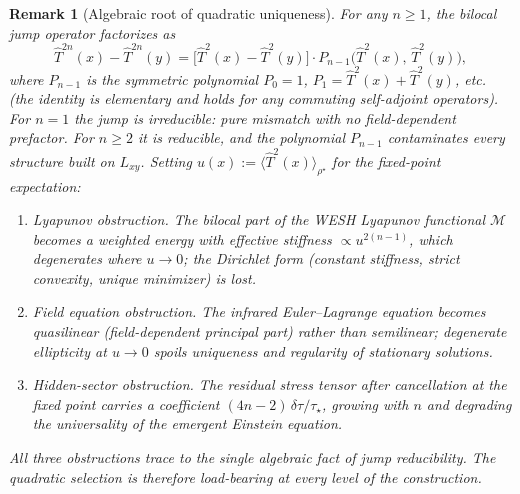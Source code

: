 \documentclass[12pt,a4paper]{article}
\newtheorem{remark}{Remark}[section]
\numberwithin{equation}{section}
\begin{document}
\begin{remark}[Algebraic root of quadratic uniqueness]
\label{rem:algebraic-T2}
For any $n \ge 1$, the bilocal jump operator factorizes as
\[
\hat T^{2n}(x) - \hat T^{2n}(y) = \bigl[\hat T^2(x) - \hat T^2(y)\bigr]\cdot P_{n-1}\bigl(\hat T^2(x),\, \hat T^2(y)\bigr),
\]
where $P_{n-1}$ is the symmetric polynomial $P_0 = 1$, $P_1 = \hat T^2(x) + \hat T^2(y)$, etc. (the identity is elementary and holds for any commuting self-adjoint operators). For $n = 1$ the jump is \emph{irreducible}: pure mismatch with no field-dependent prefactor. For $n \ge 2$ it is \emph{reducible}, and the polynomial $P_{n-1}$ contaminates every structure built on $L_{xy}$. Setting $u(x) := \langle\hat T^2(x)\rangle_{\rho^\star}$ for the fixed-point expectation:
\begin{enumerate}[label=(\alph*),leftmargin=1.5cm,itemsep=0.15em]
\item \emph{Lyapunov obstruction.} The bilocal part of the WESH Lyapunov functional $\mathcal{M}$ becomes a weighted energy with effective stiffness $\propto u^{2(n-1)}$, which degenerates where $u \to 0$; the Dirichlet form (constant stiffness, strict convexity, unique minimizer) is lost.
\item \emph{Field equation obstruction.} The infrared Euler--Lagrange equation becomes quasilinear (field-dependent principal part) rather than semilinear; degenerate ellipticity at $u \to 0$ spoils uniqueness and regularity of stationary solutions.
\item \emph{Hidden-sector obstruction.} The residual stress tensor after cancellation at the fixed point carries a coefficient $(4n{-}2)\,\delta\tau/\tau_\star$, growing with $n$ and degrading the universality of the emergent Einstein equation.
\end{enumerate}
All three obstructions trace to the single algebraic fact of jump reducibility. The quadratic selection is therefore load-bearing at every level of the construction.
\end{remark}
\end{document}
